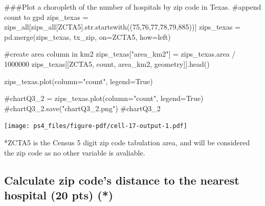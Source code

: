 \documentclass[
  letterpaper,
  DIV=11,
  numbers=noendperiod]{scrartcl}
\newenvironment{Shaded}{\begin{snugshade}}{\end{snugshade}}
\newcommand{\BuiltInTok}[1]{\textcolor[rgb]{0.00,0.23,0.31}{#1}}
\newcommand{\CommentTok}[1]{\textcolor[rgb]{0.37,0.37,0.37}{#1}}
\newcommand{\DecValTok}[1]{\textcolor[rgb]{0.68,0.00,0.00}{#1}}
\newcommand{\NormalTok}[1]{\textcolor[rgb]{0.00,0.23,0.31}{#1}}
\newcommand{\OperatorTok}[1]{\textcolor[rgb]{0.37,0.37,0.37}{#1}}
\newcommand{\StringTok}[1]{\textcolor[rgb]{0.13,0.47,0.30}{#1}}
\newcommand{\VariableTok}[1]{\textcolor[rgb]{0.07,0.07,0.07}{#1}}
\begin{document}
\begin{Shaded}
\begin{Highlighting}[]
\CommentTok{\#\#\#Plot a choropleth of the number of hospitals by zip code in Texas.}
\CommentTok{\#append count to gpd}
\NormalTok{zips\_texas }\OperatorTok{=}\NormalTok{ zips\_all[zips\_all[}\StringTok{\textquotesingle{}ZCTA5\textquotesingle{}}\NormalTok{].}\BuiltInTok{str}\NormalTok{.startswith((}\StringTok{\textquotesingle{}75\textquotesingle{}}\NormalTok{,}\StringTok{\textquotesingle{}76\textquotesingle{}}\NormalTok{,}\StringTok{\textquotesingle{}77\textquotesingle{}}\NormalTok{,}\StringTok{\textquotesingle{}78\textquotesingle{}}\NormalTok{,}\StringTok{\textquotesingle{}79\textquotesingle{}}\NormalTok{,}\StringTok{\textquotesingle{}885\textquotesingle{}}\NormalTok{))]}
\NormalTok{zips\_texas }\OperatorTok{=}\NormalTok{ pd.merge(zips\_texas, tx\_zip, on}\OperatorTok{=}\StringTok{\textquotesingle{}ZCTA5\textquotesingle{}}\NormalTok{, how}\OperatorTok{=}\StringTok{\textquotesingle{}left\textquotesingle{}}\NormalTok{)}

\CommentTok{\#create area column in km2}
\NormalTok{zips\_texas[}\StringTok{"area\_km2"}\NormalTok{] }\OperatorTok{=}\NormalTok{ zips\_texas.area }\OperatorTok{/} \DecValTok{1000000} 
\NormalTok{zips\_texas[[}\StringTok{\textquotesingle{}ZCTA5\textquotesingle{}}\NormalTok{, }\StringTok{\textquotesingle{}count\textquotesingle{}}\NormalTok{, }\StringTok{\textquotesingle{}area\_km2\textquotesingle{}}\NormalTok{, }\StringTok{\textquotesingle{}geometry\textquotesingle{}}\NormalTok{]].head()}

\NormalTok{zips\_texas.plot(column}\OperatorTok{=}\StringTok{"count"}\NormalTok{, legend}\OperatorTok{=}\VariableTok{True}\NormalTok{)}

\CommentTok{\#chartQ3\_2 = zips\_texas.plot(column="count", legend=True)}
\CommentTok{\#chartQ3\_2.save("chartQ3\_2.png")}
\CommentTok{\#chartQ3\_2}
\end{Highlighting}
\end{Shaded}

\texttt{[image: ps4\_files/figure-pdf/cell-17-output-1.pdf]}

*ZCTA5 is the Census 5 digit zip code tabulation area, and will be
considered the zip code as no other variable is avaliable.

\subsection{Calculate zip code's distance to the nearest hospital (20
pts)
(*)}\label{calculate-zip-codes-distance-to-the-nearest-hospital-20-pts}
\end{document}
